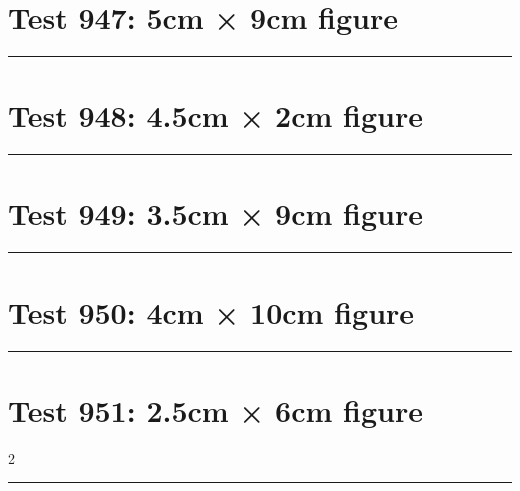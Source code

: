 \documentclass[a4paper,11pt]{article}
\begin{document}
\section*{Test 947: 5cm × 9cm figure}
\begin{swarmwrap}%
  \begin{minipage}[t]{5cm}
    \centering
    \rule{\linewidth}{9cm}
  \end{minipage}%
\end{swarmwrap}%
\swarmwrapnext
\lipsum[33]
\lipsum[34]
\lipsum[35]
\lipsum[36]
\lipsum[37]
\lipsum[38]
\section*{Test 948: 4.5cm × 2cm figure}
\begin{swarmwrap}%
  \begin{minipage}[t]{4cm}
    \centering
    \rule{\linewidth}{2cm}
  \end{minipage}%
\end{swarmwrap}%
\swarmwrapnext
\lipsum[97]
\lipsum[98]
\lipsum[99]
\lipsum[100]
\section*{Test 949: 3.5cm × 9cm figure}
\begin{swarmwrap}%
  \begin{minipage}[t]{3cm}
    \centering
    \rule{\linewidth}{9cm}
  \end{minipage}%
\end{swarmwrap}%
\swarmwrapnext
\lipsum[123]
\lipsum[124]
\lipsum[125]
\lipsum[126]
\section*{Test 950: 4cm × 10cm figure}
\begin{swarmwrap}%
  \begin{minipage}[t]{4cm}
    \centering
    \rule{\linewidth}{10cm}
  \end{minipage}%
\end{swarmwrap}%
\swarmwrapnext
\lipsum[90]
\lipsum[91]
\lipsum[92]
\lipsum[93]
\lipsum[94]
\section*{Test 951: 2.5cm × 6cm figure}
\begin{multicols}{2}
  \begin{swarmwrap}%
    \begin{minipage}[t]{2cm}
      \centering
      \rule{\linewidth}{6cm}
    \end{minipage}%
  \end{swarmwrap}%
  \swarmwrapnext
  \lipsum[74]
  \lipsum[75]
  \lipsum[76]
\end{multicols}
\end{document}
